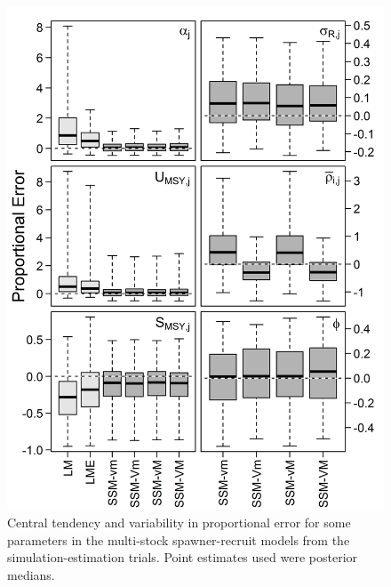 \documentclass[12pt,]{book}
\theoremstyle{definition}
\theoremstyle{definition}
\theoremstyle{definition}
\theoremstyle{remark}
\begin{document}
\clearpage

\begin{figure}
  \centering
  \includegraphics{img/Ch4/param-bias.jpg}
  \caption{Central tendency and variability in proportional error for some parameters in the multi-stock spawner-recruit models from the simulation-estimation trials. Point estimates used were posterior medians.}
  \label{fig:param-bias}
\end{figure}

\clearpage
\end{document}
